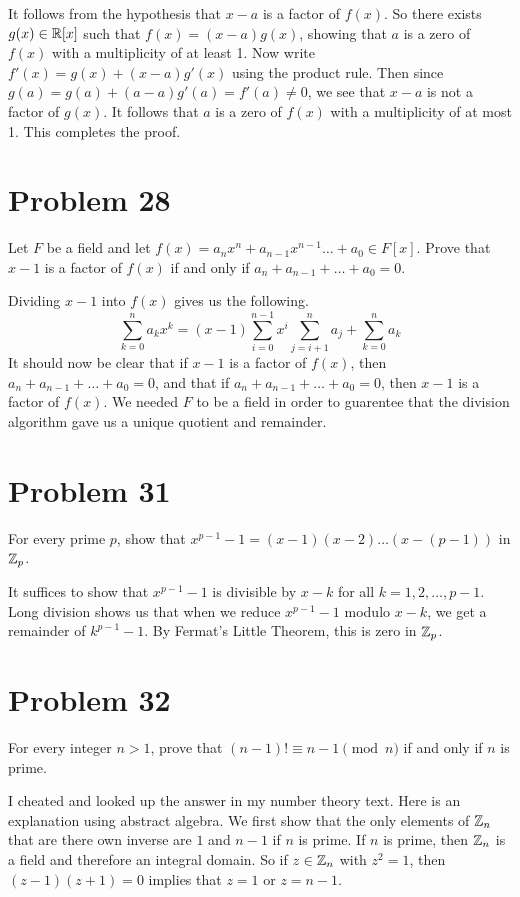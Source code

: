\documentclass{article}
\begin{document}
It follows from the hypothesis that $x-a$ is a factor of $f(x)$.  So there exists
$g(x)\in\mathbb{R}[x]$ such that $f(x)=(x-a)g(x)$, showing that
$a$ is a zero of $f(x)$ with a multiplicity of at least 1.
Now write $f'(x)=g(x)+(x-a)g'(x)$ using the product rule.
Then since $g(a)=g(a)+(a-a)g'(a)=f'(a)\neq 0$, we see that $x-a$ is
not a factor of $g(x)$.  It follows that $a$ is a zero of $f(x)$
with a multiplicity of at most 1.  This completes the proof.

\section*{Problem 28}

Let $F$ be a field and let $f(x)=a_nx^n+a_{n-1}x^{n-1}\dots+a_0\in F[x]$.
Prove that $x-1$ is a factor of $f(x)$ if and only if $a_n+a_{n-1}+\dots+a_0=0$.

Dividing $x-1$ into $f(x)$ gives us the following.
\begin{equation*}
\sum_{k=0}^na_kx^k=(x-1)\sum_{i=0}^{n-1}x^i\sum_{j=i+1}^na_j+\sum_{k=0}^na_k
\end{equation*}
It should now be clear that if $x-1$ is a factor of $f(x)$, then
$a_n+a_{n-1}+\dots+a_0=0$, and that if $a_n+a_{n-1}+\dots+a_0=0$,
then $x-1$ is a factor of $f(x)$.  We needed $F$ to be a field in order
to guarentee that the division algorithm gave us a unique quotient and remainder.

\section*{Problem 31}

For every prime $p$, show that $x^{p-1}-1=(x-1)(x-2)\dots(x-(p-1))$ in $\mathbb{Z}_p$.

It suffices to show that $x^{p-1}-1$ is divisible by $x-k$ for all
$k=1,2,\dots,p-1$.  Long division shows us that when we reduce
$x^{p-1}-1$ modulo $x-k$, we get a remainder of $k^{p-1}-1$.
By Fermat's Little Theorem, this is zero in $\mathbb{Z}_p$.

\section*{Problem 32}

For every integer $n>1$, prove that $(n-1)!\equiv n-1\pmod{n}$ if
and only if $n$ is prime.

I cheated and looked up the answer in my number theory text.
Here is an explanation using abstract algebra.
We first show that the only elements of $\mathbb{Z}_n$ that
are there own inverse are $1$ and $n-1$ if $n$ is prime.
If $n$ is prime, then $\mathbb{Z}_n$ is a field and therefore an
integral domain.  So if $z\in\mathbb{Z}_n$
with $z^2=1$, then $(z-1)(z+1)=0$ implies that $z=1$ or $z=n-1$.
\end{document}

